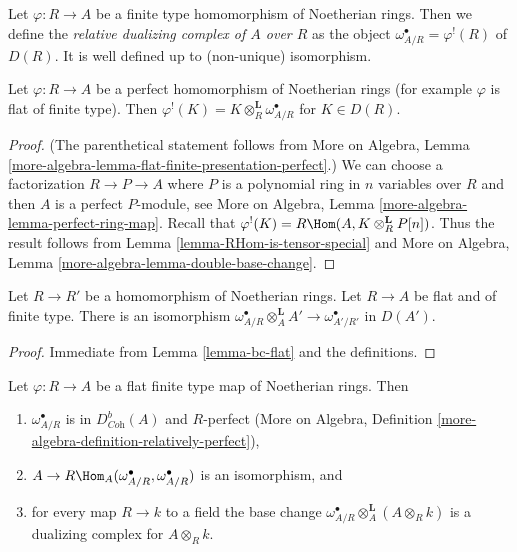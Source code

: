 \noindent
Let $\varphi : R \to A$ be a finite type homomorphism of
Noetherian rings. Then we define the {\it relative dualizing
complex of $A$ over $R$} as the object
$\omega_{A/R}^\bullet = \varphi^!(R)$ of $D(R)$.
It is well defined up to (non-unique) isomorphism.

\begin{lemma}
\label{lemma-upper-shriek-is-tensor-functor}
Let $\varphi : R \to A$ be a perfect homomorphism of Noetherian rings
(for example $\varphi$ is flat of finite type).
Then $\varphi^!(K) = K \otimes_R^\mathbf{L} \omega_{A/R}^\bullet$
for $K \in D(R)$.
\end{lemma}

\begin{proof}
(The parenthetical statement follows from
More on Algebra, Lemma
\ref{more-algebra-lemma-flat-finite-presentation-perfect}.)
We can choose a factorization $R \to P \to A$ where $P$ is a polynomial
ring in $n$ variables over $R$ and then $A$ is a perfect $P$-module, see
More on Algebra, Lemma \ref{more-algebra-lemma-perfect-ring-map}.
Recall that $\varphi^!(K) = R\Hom(A, K \otimes_R^\mathbf{L} P[n])$.
Thus the result follows from
Lemma \ref{lemma-RHom-is-tensor-special}
and More on Algebra, Lemma \ref{more-algebra-lemma-double-base-change}.
\end{proof}

\begin{lemma}
\label{lemma-base-change-relative-algebraic}
Let $R \to R'$ be a homomorphism of Noetherian rings.
Let $R \to A$ be flat and of finite type. There is an isomorphism
$\omega_{A/R}^\bullet \otimes_A^\mathbf{L} A' \to \omega^\bullet_{A'/R'}$
in $D(A')$.
\end{lemma}

\begin{proof}
Immediate from Lemma \ref{lemma-bc-flat} and the definitions.
\end{proof}

\begin{lemma}
\label{lemma-relative-dualizing-algebraic}
Let $\varphi : R \to A$ be a flat finite type map of Noetherian rings.
Then
\begin{enumerate}
\item $\omega_{A/R}^\bullet$ is in $D^b_{\textit{Coh}}(A)$
and $R$-perfect (More on Algebra,
Definition \ref{more-algebra-definition-relatively-perfect}),
\item $A \to R\Hom_A(\omega_{A/R}^\bullet, \omega_{A/R}^\bullet)$
is an isomorphism, and
\item for every map $R \to k$ to a field the base change
$\omega_{A/R}^\bullet \otimes_A^\mathbf{L} (A \otimes_R k)$
is a dualizing complex for $A \otimes_R k$.
\end{enumerate}
\end{lemma}

